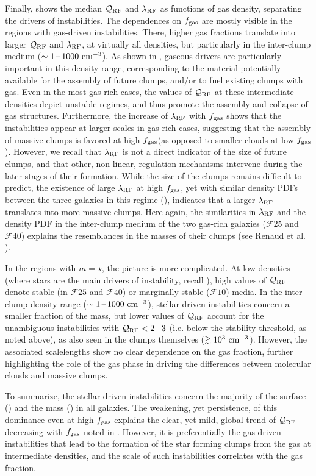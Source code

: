 \documentclass[useAMS,usenatbib]{mnras}
\newcommand{\fgas}{\ensuremath{f_{\rm gas}}\xspace}
\newcommand{\qrf}{\ensuremath{\mathcal{Q}_{\rm RF}}\xspace}
\newcommand{\lrf}{\ensuremath{\lambda_{\rm RF}}\xspace}
\newcommand{\gs}{\ensuremath{\mathcal{F}10}\xspace}
\newcommand{\gm}{\ensuremath{\mathcal{F}25}\xspace}
\newcommand{\gl}{\ensuremath{\mathcal{F}40}\xspace}
\begin{document}
Finally,  shows the median \qrf and \lrf as functions of gas density, separating the drivers of instabilities. The dependences on \fgas are mostly visible in the regions with gas-driven instabilities. There, higher gas fractions translate into larger \qrf and \lrf, at virtually all densities, but particularly in the inter-clump medium ($\sim 1 \textrm{\,--\,} 1000 \mathrm{~cm^{-3}}$). As shown in , gaseous drivers are particularly important in this density range, corresponding to the material potentially available for the assembly of future clumps, and/or to fuel existing clumps with gas. Even in the most gas-rich cases, the values of \qrf at these intermediate densities depict unstable regimes, and thus promote the assembly and collapse of gas structures. Furthermore, the increase of \lrf with \fgas shows that the instabilities appear at larger scales in gas-rich cases, suggesting that the assembly of massive clumps is favored at high \fgas (as opposed to smaller clouds at low \fgas). However, we recall that \lrf is not a direct indicator of the size of future clumps, and that other, non-linear, regulation mechanisms intervene during the later stages of their formation. While the size of the clumps remains difficult to predict, the existence of large \lrf at high \fgas, yet with similar density PDFs between the three galaxies in this regime (), indicates that a larger \lrf translates into more massive clumps. Here again, the similarities in \lrf and the density PDF in the inter-clump medium of the two gas-rich galaxies (\gm and \gl) explains the resemblances in the masses of their clumps (see Renaud et al. \inprep).

In the regions with $m=\star$, the picture is more complicated. At low densities (where stars are the main drivers of instability, recall ), high values of \qrf denote stable (in \gm and \gl) or marginally stable (\gs) media. In the inter-clump density range ($\sim 1 \textrm{\,--\,} 1000 \mathrm{~cm^{-3}}$), stellar-driven instabilities concern a smaller fraction of the mass, but lower values of \qrf account for the unambiguous instabilities with $\qrf < 2\mh 3$ (i.e. below the stability threshold, as noted above), as also seen in the clumps themselves ($\gtrsim 10^3 \mathrm{~cm^{-3}}$). However, the associated scalelengths show no clear dependence on the gas fraction, further highlighting the role of the gas phase in driving the differences between molecular clouds and massive clumps.

To summarize, the stellar-driven instabilities concern the majority of the surface () and the mass () in all galaxies. The weakening, yet persistence, of this dominance even at high \fgas explains the clear, yet mild, global trend of \qrf decreasing with \fgas noted in . However, it is preferentially the gas-driven instabilities that lead to the formation of the star forming clumps from the gas at intermediate densities, and the scale of such instabilities correlates with the gas fraction.
\end{document}
